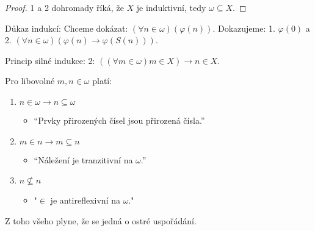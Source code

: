 \begin{proof}
	1 a 2 dohromady říká, že $X$ je induktivní, tedy $\omega \subseteq X$.
\end{proof}

\begin{prikl}
	Důkaz indukcí: Chceme dokázat: $(\forall n \in \omega)(\varphi(n))$. Dokazujeme: 1. $\varphi(0)$ a 2. $(\forall n \in \omega)(\varphi(n) \rightarrow \varphi(S(n)))$.
\end{prikl}

\begin{pozn}
	Princip silné indukce: 2: $((\forall m \in \omega) m \in X) \rightarrow n \in X$.
\end{pozn}

\begin{lemma}
	Pro libovolné $m,n \in \omega$ platí:
	
	\begin{enumerate}
		\item $n \in \omega \rightarrow n \subseteq \omega$
		\begin{itemize}
			\item “Prvky přirozených čísel jsou přirozená čísla.”
		\end{itemize}
		\item $m \in n \rightarrow m \subseteq n$
		\begin{itemize}
			\item “Náležení je tranzitivní na $\omega$.”
		\end{itemize}
		\item $n \nsubseteq n$
		\begin{itemize}
			\item "$\in$ je antireflexivní na $\omega$."
		\end{itemize}
	\end{enumerate}
	
	Z toho všeho plyne, že se jedná o ostré uspořádání.
\end{lemma}

